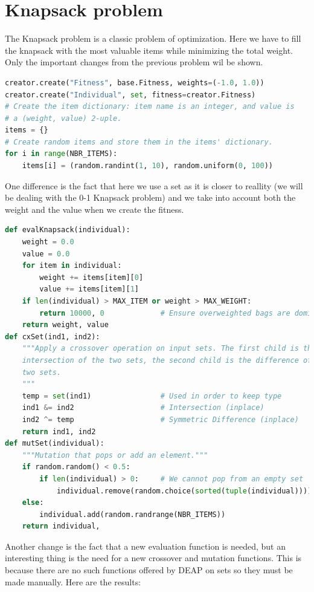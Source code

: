 \documentclass[a4paper,12pt]{report}
\begin{document}
\section {Knapsack problem}

The Knapsack problem is a classic problem of optimization. Here we have to fill the knapsack with the most valuable items while minimizing the total weight. Only the important changes from the previous problem wil be shown.

\begin{lstlisting}[language=Python]
creator.create("Fitness", base.Fitness, weights=(-1.0, 1.0))
creator.create("Individual", set, fitness=creator.Fitness)
# Create the item dictionary: item name is an integer, and value is 
# a (weight, value) 2-uple.
items = {}
# Create random items and store them in the items' dictionary.
for i in range(NBR_ITEMS):
    items[i] = (random.randint(1, 10), random.uniform(0, 100))
\end{lstlisting}

One difference is the fact that here we use a set as it is closer to reallity (we will be dealing with the 0-1 Knapsack problem) and we take into account both the weight and the value when we create the fitness.

\begin{lstlisting}[language=Python]
def evalKnapsack(individual):
    weight = 0.0
    value = 0.0
    for item in individual:
        weight += items[item][0]
        value += items[item][1]
    if len(individual) > MAX_ITEM or weight > MAX_WEIGHT:
        return 10000, 0             # Ensure overweighted bags are dominated
    return weight, value
def cxSet(ind1, ind2):
    """Apply a crossover operation on input sets. The first child is the
    intersection of the two sets, the second child is the difference of the
    two sets.
    """
    temp = set(ind1)                # Used in order to keep type
    ind1 &= ind2                    # Intersection (inplace)
    ind2 ^= temp                    # Symmetric Difference (inplace)
    return ind1, ind2
def mutSet(individual):
    """Mutation that pops or add an element."""
    if random.random() < 0.5:
        if len(individual) > 0:     # We cannot pop from an empty set
            individual.remove(random.choice(sorted(tuple(individual))))
    else:
        individual.add(random.randrange(NBR_ITEMS))
    return individual,
\end{lstlisting}

Another change is the fact that a new evaluation function is needed, but an interesting thing is the need for a new crossover and mutation functions. This is because there are no such functions offered by DEAP on sets so they must be made manually. Here are the results:
\end{document}

